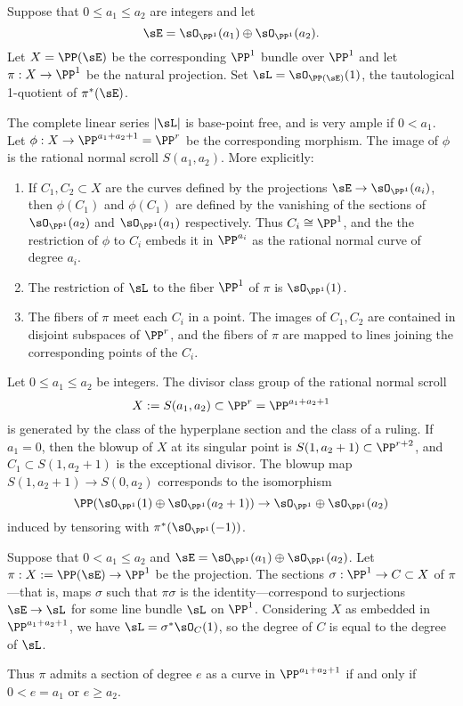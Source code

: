 \begin{theorem} 
Suppose that $0\leq a_1\leq a_2$ are integers and let 
$$
\sE = \sO_{\PP^1}(a_1) \oplus \sO_{\PP^1}(a_2).
$$
 Let $X = \PP(\sE)$  be the corresponding $\PP^1$ bundle over $\PP^1$
and let $\pi: X \to \PP^1$ be the natural projection. Set $\sL =   \sO_{\PP(\sE)}(1)$, the tautological 1-quotient of $\pi^*(\sE)$.

The complete linear series $|\sL|$ is base-point free, and is very ample if $0<a_1$. 
Let $\phi:X\to \PP^{a_1+a_2+1} = \PP^r$ be the corresponding morphism. The image of $\phi$ is the rational normal scroll $S(a_1,a_2).$
More explicitly:
\begin{enumerate}
 \item If $C_1, C_2\subset X$ are the curves defined by the projections $\sE \to \sO_{\PP^1}(a_i)$, then $\phi(C_1)$ and $\phi(C_1)$
 are defined by the vanishing
of the sections of $\sO_{\PP^1}(a_2)$ and  $\sO_{\PP^1}(a_1)$ respectively. Thus $C_i \cong \PP^1$,
and the the restriction of $\phi$ to $C_i$ embeds it in $\PP^{a_i}$ as the rational normal curve of degree $a_i$.

\item The restriction of $\sL$ to the fiber $\PP^1$ of $\pi$ is $\sO_{\PP^1}(1)$.

\item The fibers of $\pi$ meet each $C_i$ in a point. The images of $C_1, C_2$ are contained in disjoint subspaces of $\PP^r$, and the fibers of $\pi$ are mapped 
to lines joining the corresponding points of the $C_i$.
\end{enumerate}
\end{theorem}


\begin{corollary}\cite[Section V.2]{Hartshorne1977}
Let $0\leq a_1\leq a_2$ be integers. The divisor class group of the 
rational normal scroll 
$$
X:=S(a_1,a_2) \subset \PP^r = \PP^{a_1+a_2+1}
$$
is generated by the class of the hyperplane section and the class
of a ruling. If $a_1 = 0$, then the blowup of $X$ at its singular point is $S(1, a_2+1)\subset \PP^{r+2}$,
and $C_1\subset S(1, a_2+1)$ is the exceptional divisor. The blowup map $S(1, a_2+1) \to S(0,a_2)$
corresponds to the isomorphism 
$$
\PP(\sO_{\PP^1}(1) \oplus \sO_{\PP^1}(a_2+1)) \to \sO_{\PP^1} \oplus \sO_{\PP^1}(a_2)
$$
induced by tensoring with $\pi^*(\sO_{\PP^1}(-1))$.
\end{corollary}

\begin{proposition} Suppose that $0<a_1\leq a_2$ and
$\sE = \sO_{\PP^1}(a_1)\oplus \sO_{\PP^1}(a_2)$. Let $\pi: X:= \PP(\sE) \to \PP^1$ be the projection.
The sections $\sigma:\PP^1 \to C\subset X$ of $\pi$---that is, maps $\sigma$ such that $\pi\sigma$ is the 
identity---correspond to surjections
$\sE \to \sL$ for some line bundle $\sL$ on $\PP^1$. Considering  $X$ as embedded in 
$\PP^{a_1+a_2+1}$, we have $\sL = \sigma^*\sO_C(1)$, so the degree of $C$ is equal
to the degree of $\sL$.

Thus $\pi$ admits a section of degree $e$ as a curve in $\PP^{a_1+a_2+1}$ if and only if
$0<e = a_1$ or $e\geq a_2$.
\end{proposition}

